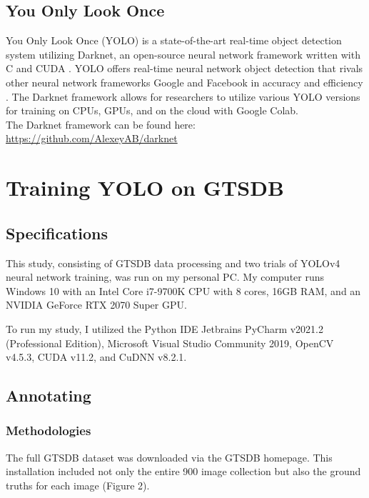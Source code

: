 \documentclass{article}
\begin{document}
        \subsection{You Only Look Once}
        
        You Only Look Once (YOLO) is a state-of-the-art real-time object detection system utilizing Darknet, an open-source neural network framework written with C and CUDA \cite{darknet13}. YOLO offers real-time neural network object detection that rivals other neural network frameworks Google and Facebook in accuracy and efficiency \cite{Bochkovskiy_2020}. The Darknet framework allows for researchers to utilize various YOLO versions for training on CPUs, GPUs, and on the cloud with Google Colab.  \\
        
        The Darknet framework can be found here: \url{https://github.com/AlexeyAB/darknet}
    
    \pagebreak
    \section{Training YOLO on GTSDB}
    
        \subsection{Specifications}
        
        This study, consisting of GTSDB data processing and two trials of YOLOv4 neural network training, was run on my personal PC. My computer runs Windows 10 with an Intel Core i7-9700K CPU with 8 cores, 16GB RAM, and an NVIDIA GeForce RTX 2070 Super GPU. 
        
        To run my study, I utilized the Python IDE Jetbrains PyCharm v2021.2 (Professional Edition), Microsoft Visual Studio Community 2019, OpenCV v4.5.3, CUDA v11.2, and CuDNN v8.2.1. 
        
        \subsection{Annotating}
        
            \subsubsection{Methodologies}
        
            The full GTSDB dataset was downloaded via the GTSDB homepage. This installation included not only the entire 900 image collection but also the ground truths for each image (Figure 2).
            
\end{document}
